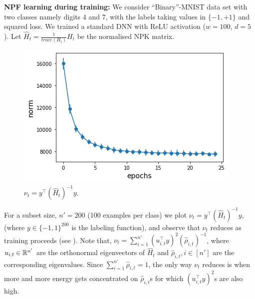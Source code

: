 
\textbf{NPF learning during training:} We consider ``Binary''-MNIST data set with two classes namely digits $4$ and $7$, with the labels taking values in $\{-1,+1\}$ and squared loss. We trained a standard DNN with ReLU activation ($w=100$, $d=5$). Let $\widehat{H}_t=\frac{1}{trace(H_t)}H_t$ be the normalised NPK matrix. 
\begin{figure}
\includegraphics[scale=0.25]{figs/path-gram.png}
\caption{\label{fig:gen}$\nu_t=y^\top (\widehat{H}_t)^{-1} y$.}
\end{figure}
For a subset size, $n'=200$ ($100$ examples per class) we plot $\nu_t=y^\top (\widehat{H}_t)^{-1} y$, (where $y\in\{-1,1\}^{200}$ is the labeling function), and observe that $\nu_t$ reduces as training proceeds (see ). Note that, $\nu_t=\sum_{i=1}^{n'}(u_{i,t}^\top y)^2 (\hat{\rho}_{i,t})^{-1}$, where $u_{i,t}\in \mathbb{R}^{n'}$ are the orthonormal eigenvectors of $\widehat{H}_t$ and $\hat{\rho}_{i,t},i\in[n']$ are the corresponding eigenvalues. Since $\sum_{i=1}^{n'}\hat{\rho}_{i,t}=1$, the only way $\nu_t$ reduces is when more and more energy gets concentrated on $\hat{\rho}_{i,t}$s for which $(u_{i,t}^\top y)^2$s are also high.\WFclear%

